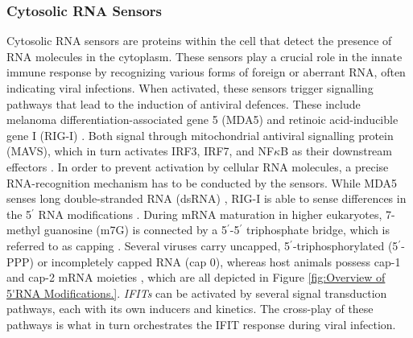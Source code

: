\subsubsection{Cytosolic RNA Sensors} \label{Cytosolic Nuclec Acid Sensors}
Cytosolic RNA sensors are proteins within the cell that detect the presence of RNA molecules in the cytoplasm. These sensors play a crucial role in the innate immune response by recognizing various forms of foreign or aberrant RNA, often indicating viral infections. When activated, these sensors trigger signalling pathways that lead to the induction of antiviral defences. These include melanoma differentiation-associated gene 5 (MDA5) and retinoic acid-inducible gene I (RIG-I) \cite{Vladimer2014IFITs:Proteins}. Both signal through mitochondrial antiviral signalling protein (MAVS), which in turn activates IRF3, IRF7, and NF\(\kappa\)B as their downstream effectors \cite{Ashley2019Interferon-IndependentCytomegalovirus}. In order to prevent activation by cellular RNA molecules, a precise RNA-recognition mechanism has to be conducted by the sensors. While MDA5 senses long double-stranded RNA (dsRNA) \cite{Brisse2019ComparativeMDA5}, RIG-I is able to sense differences in the 5$^{\prime}$ RNA modifications \cite{Schlee2016DiscriminatingSensing}. During mRNA maturation in higher eukaryotes, 7-methyl guanosine (m7G) is connected by a 5$^{\prime}$-5$^{\prime}$ triphosphate bridge, which is referred to as capping \cite{Devarkar2016StructuralRIG-I, Ramanathan2016MRNAApplications}. Several viruses carry uncapped, 5$^{\prime}$-triphosphorylated (5$^{\prime}$-PPP) or incompletely capped RNA (cap 0), whereas host animals possess cap-1 and cap-2 mRNA moieties \cite{Choi2018ACaps}, which are all depicted in Figure \ref{fig:Overview of 5'RNA Modifications.}. \textit{IFITs} can be activated by several signal transduction pathways, each with its own inducers and kinetics. The cross-play of these pathways is what in turn orchestrates the IFIT response during viral infection.

